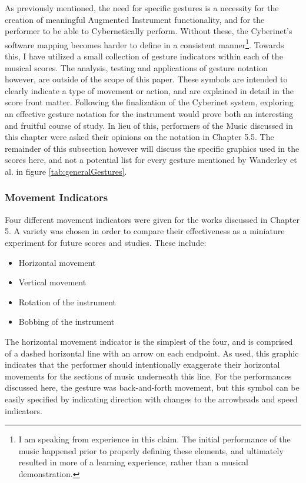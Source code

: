 As previously mentioned, the need for specific gestures is a necessity for the creation of meaningful Augmented Instrument functionality, and for the performer to be able to Cybernetically perform. Without these, the Cyberinet's software mapping becomes harder to define in a consistent manner\footnote{I am speaking from experience in this claim. The initial performance of the music happened prior to properly defining these elements, and ultimately resulted in more of a learning experience, rather than a musical demonstration.}. Towards this, I have utilized a small collection of gesture indicators within each of the musical scores. The analysis, testing and applications of gesture notation however, are outside of the scope of this paper. These symbols are intended to clearly indicate a type of movement or action, and are explained in detail in the score front matter. Following the finalization of the Cyberinet system, exploring an effective gesture notation for the instrument would prove both an interesting and fruitful course of study. In lieu of this, performers of the Music discussed in this chapter were asked their opinions on the notation in Chapter 5.5. The remainder of this subsection however will discuss the specific graphics used in the scores here, and not a potential list for every gesture mentioned by Wanderley et al. in figure \ref{tab:generalGestures}.


\subsubsection{Movement Indicators}
Four different movement indicators were given for the works discussed in Chapter 5. A variety was chosen in order to compare their effectiveness as a miniature experiment for future scores and studies. These include: 

\begin{itemize}
    \item Horizontal movement
    \item Vertical movement
    \item Rotation of the instrument
    \item Bobbing of the instrument
\end{itemize}

The horizontal movement indicator is the simplest of the four, and is comprised of a dashed horizontal line with an arrow on each endpoint. As used, this graphic indicates that the performer should intentionally exaggerate their horizontal movements for the sections of music underneath this line. For the performances discussed here, the gesture was back-and-forth movement, but this symbol can be easily specified by indicating direction with changes to the arrowheads and speed indicators.

